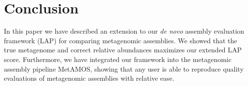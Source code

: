 


\section{Conclusion}
In this paper we have described an extension to our \emph{de novo} assembly evaluation framework (LAP) for comparing metagenomic assemblies.
We showed that the true metagenome and correct relative abundances maximizes our extended LAP score.
Furthermore, we have integrated our framework into the metagenomic assembly pipeline MetAMOS, showing that any user is able to reproduce quality evaluations of metagenomic assemblies with relative ease.
